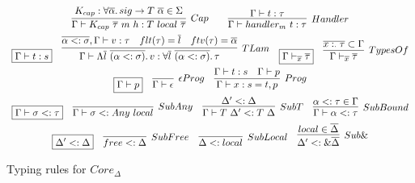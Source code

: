 \documentclass[acmsmall]{acmart}
\newcommand{\mathframebox}[1]{\framebox{$\displaystyle #1$}}
\newcommand{\ap}{~}
\begin{document}
\begin{figure}
\begin{gather*}
        \infer[Cap]{
            \Gamma\vdash K_{cap}\ap\overline{\tau}\ap m\ap h : T\ap local \ap\overline{\tau}
        }{
            K_{cap} : \forall\overline{\alpha}\ldotp sig\to T\ap\overline{\alpha} \in \Sigma
        }
        \hspace{2em}
        \infer[Handler]{
            \Gamma\vdash handler_m ~t : \tau
        }{
            \Gamma\vdash t : \tau
        }\\
        \begin{array}{cccc}
            \mathframebox{\Gamma\vdash t : s} &
            \infer[TLam]{
                \Gamma\vdash\Lambda\overline{l}\ap\overline{(\alpha <: \sigma)}\ldotp v : \forall\overline{l}\ap\overline{(\alpha <: \sigma)}\ldotp\tau
            }{
                \overline{\alpha <: \sigma}, \Gamma\vdash v : \tau & flt(\tau) = \overline{l} & ftv(\tau) = \overline{\alpha}
            } &
            \mathframebox{\Gamma\vdash_{\overline{x}}\overline{\tau}}
            &
            \infer[TypesOf]{\Gamma\vdash_{\overline{x}}\overline{\tau}}{\overline{x :_\cdot \tau} \subset \Gamma}
        \end{array} \\
        \begin{array}{ccc}
            \mathframebox{\Gamma\vdash p} &
            \infer[\epsilon Prog]{\Gamma\vdash\epsilon}{} &
            \infer[Prog]{\Gamma\vdash x : s = t, p}{\Gamma\vdash t : s & \Gamma\vdash p}
        \end{array}\\
        \begin{array}{cccc}
            \mathframebox{\Gamma\vdash \sigma <: \tau} &
            \infer[SubAny]{\Gamma\vdash \sigma <: Any\ap local}{} &
            \infer[SubT]{\Gamma\vdash T\ap\Delta' <: T\ap\Delta}{\Delta' <: \Delta} &
            \infer[SubBound]{\Gamma\vdash \alpha <: \tau}{\alpha <: \tau \in \Gamma}
        \end{array} \\
        \begin{array}{cccc}
            \mathframebox{\Delta' <: \Delta} &
            \infer[SubFree]{free <: \Delta}{} &
            \infer[SubLocal]{\Delta <: local}{} &
            \infer[Sub\&]{\Delta' <: \&\overline{\Delta}}{local\in\overline{\Delta}}
        \end{array}
    \end{gather*}
    \caption{Typing rules for $Core_{\Delta}$}
    \label{fig:core-delta-typing}
\end{figure}
\end{document}
